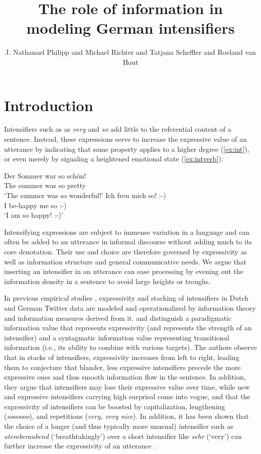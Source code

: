\documentclass[output=paper,colorlinks,citecolor=brown]{langscibook}
\title{The role of information in modeling German intensifiers}
\author{J. Nathanael Philipp\orcid{0000-0003-0577-7831}\affiliation{Sächsische Akademie der Wissenschaften zu Leipzig; University of Leipzig} and Michael Richter\orcid{0000-0001-7460-4139}\affiliation{University of Leipzig} and Tatjana Scheffler\orcid{0000-0001-7498-6202}\affiliation{Ruhr University Bochum} and Roeland van Hout\orcid{0000-0002-8870-1631}\affiliation{Radboud University}}
\begin{document}
\maketitle

\section{Introduction} 
Intensifiers such as as \textit{very} and \textit{so} add little to the referential content of a sentence. Instead, these expressions serve to increase the expressive value of an utterance by indicating that some property applies to a higher degree (\ref{ex:int}), or even merely by signaling a heightened emotional state (\ref{ex:intverb}):

\ea\label{ex:int}
\gll Der Sommer war so schön!\footnotemark\\
The summer was so pretty\\
\glt `The summer was so wonderful!'
\ex\label{ex:intverb}
\gll Ich freu mich so! :-)\\
I be-happy me so :-)\\
\glt `I am so happy! :-)'
\z

Intensifying expressions are subject to immense variation in a language and can often be added to an utterance in informal discourse without adding much to its core denotation. Their use and choice are therefore governed by expressivity as well as information structure and general communicative needs. We argue that inserting an intensifier in an utterance can ease processing by evening out the information density in a sentence to avoid large heights or troughs. 


In previous empirical studies \citep{richter2020ranking,scherihou2022}, expressivity and stacking of intensifiers in Dutch and German  Twitter data are modeled and operationalized by information theory \citep{shannon1948mathematical} and information measures derived from it. \citet{richter2020ranking} and \citet{scherihou2022} distinguish a paradigmatic  information value that represents expressivity (and represents the strength of an intensifier) and a syntagmatic information value representing transitional information (i.e., its ability to combine with various targets). The authors observe that in stacks of intensifiers, expressivity increases from left to right, leading them to conjecture that blander, less expressive intensifiers precede the more expressive ones and thus smooth information flow in the sentence.
In addition, they argue that intensifiers may lose their expressive value over time, while new and expressive intensifiers carrying high surprisal come into vogue, and that the expressivity of intensifiers can be boosted by capitalization, lengthening (\textit{soooooo}), and repetitions (\textit{very, very nice}). In addition, it has been shown that the choice of a longer (and thus typically more unusual) intensifier such as \textit{atemberaubend} (`breathtakingly') over a short intensifier like \textit{sehr} (`very') can further increase the expressivity of an utterance \citep{bennett2018extremely}.
\end{document}
